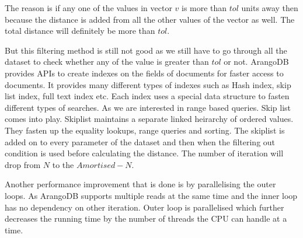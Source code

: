 The reason is if any one of the values in vector \(v\) is more than \(tol\) units away then because the distance is added from all the other values of the vector as well. The total distance will definitely be more than \(tol\).

But this filtering method is still not good as we still have to go through all the dataset to check whether any of the value is greater than \(tol\) or not. ArangoDB provides APIs to create indexes on the fields of documents for faster access to documents. It provides many different types of indexes such as Hash index, skip list index, full text index etc. Each index uses a special data structure to fasten different types of searches. As we are interested in range based queries. Skip list comes into play. Skiplist maintains a separate linked heirarchy of ordered values. They fasten up the equality lookups, range queries and sorting. The skiplist is added on to every parameter of the dataset and then when the filtering out condition is used before calculating the distance. The number of iteration will drop from \(N\) to the \(Amortised-N\).

Another performance improvement that is done is by parallelising the outer loops. As ArangoDB supports multiple reads at the same time and the inner loop has no dependency on other iteration. Outer loop is parallelised which further decreases the running time by the number of threads the CPU can handle at a time. 
